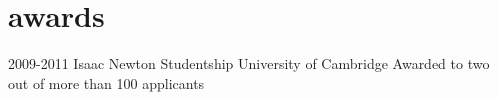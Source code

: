 \documentclass[]{friggeri-cv}
\begin{document}
    \section{awards}
        \begin{entrylist}
            \entry
            {2009-2011}
            {Isaac Newton Studentship}
            {University of Cambridge}
            {Awarded to two out of more than 100 applicants}
        \end{entrylist}
\end{document}
